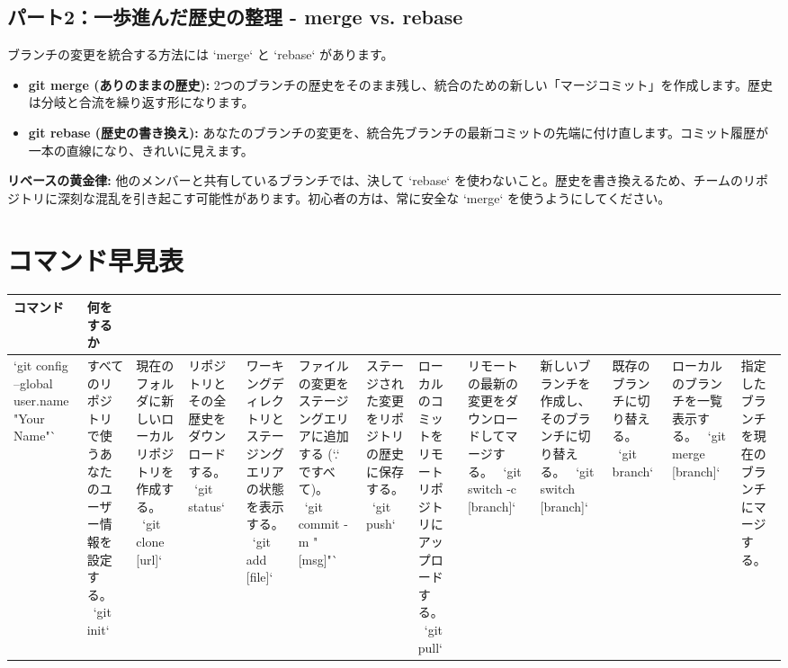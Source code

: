 \documentclass{ltjsarticle}
\begin{document}
\subsection{パート2：一歩進んだ歴史の整理 - merge vs. rebase}
ブランチの変更を統合する方法には `merge` と `rebase` があります。
\begin{itemize}
    \item \textbf{git merge (ありのままの歴史):} 2つのブランチの歴史をそのまま残し、統合のための新しい「マージコミット」を作成します。歴史は分岐と合流を繰り返す形になります。
    \item \textbf{git rebase (歴史の書き換え):} あなたのブランチの変更を、統合先ブランチの最新コミットの先端に付け直します。コミット履歴が一本の直線になり、きれいに見えます。
\end{itemize}
\textbf{リベースの黄金律:} 他のメンバーと共有しているブランチでは、決して `rebase` を使わないこと。歴史を書き換えるため、チームのリポジトリに深刻な混乱を引き起こす可能性があります。初心者の方は、常に安全な `merge` を使うようにしてください。

\appendix
\section{コマンド早見表}
\begin{tabularx}{\textwidth}{|l|X|}
\hline
\textbf{コマンド} & \textbf{何をするか} \\ 
\hline
`git config --global user.name "Your Name"` & すべてのリポジトリで使うあなたのユーザー情報を設定する。 \ 
`git init` & 現在のフォルダに新しいローカルリポジトリを作成する。 \ 
`git clone [url]` & リポジトリとその全歴史をダウンロードする。 \ 
`git status` & ワーキングディレクトリとステージングエリアの状態を表示する。 \ 
`git add [file]` & ファイルの変更をステージングエリアに追加する (`.` ですべて)。 \ 
`git commit -m "[msg]"` & ステージされた変更をリポジトリの歴史に保存する。 \ 
`git push` & ローカルのコミットをリモートリポジトリにアップロードする。 \ 
`git pull` & リモートの最新の変更をダウンロードしてマージする。 \ 
`git switch -c [branch]` & 新しいブランチを作成し、そのブランチに切り替える。 \ 
`git switch [branch]` & 既存のブランチに切り替える。 \ 
`git branch` & ローカルのブランチを一覧表示する。 \ 
`git merge [branch]` & 指定したブランチを現在のブランチにマージする。 \ 
\hline
\end{tabularx}
\end{document}
